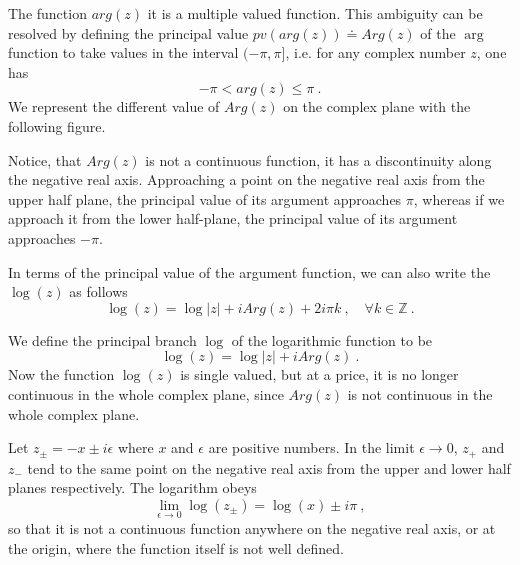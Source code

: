 \documentclass[10pt]{book}
\newcommand{\abs}[1]{\left|#1\right|}
\newcommand{\Zbb}{\mathbb{Z}}
\theoremstyle{break}
\begin{document}
The function $arg(z)$ it is a multiple valued function. This ambiguity can be resolved by defining the principal value $pv\left(arg(z)\right)\doteq Arg\left(z\right)$ of the $\arg$ function to take values in the interval $(-\pi,\pi]$, i.e. for any complex number $z$, one has
\begin{equation*}
 -\pi < arg(z) \leq \pi \ .
\end{equation*}
We represent the different value of $Arg(z)$ on the complex plane with the following figure. \par
Notice, that $Arg(z)$ is not a continuous function, it has a discontinuity along the negative real axis. Approaching a point on the negative real axis from the upper half plane, the principal value of its argument approaches $\pi$, whereas if we approach it from the lower half-plane, the principal value of its argument approaches $-\pi$. \par

In terms of the principal value of the argument function, we can also write the $\log(z)$ as follows
\begin{equation*}
 \log(z) = \log\abs{z} + iArg\left(z\right)  + 2i\pi k \ , \quad \forall k \in \Zbb \ .
\end{equation*}

We define the principal branch $\log$ of the logarithmic function to be
\begin{equation*}
 \log(z) = \log\abs{z} + i Arg(z) \ .
\end{equation*}
Now the function $\log(z)$ is single valued, but at a price, it is no longer continuous in the whole complex plane, since $Arg(z)$ is not continuous in the whole complex plane. \par

Let $z_{\pm} = -x \pm i \epsilon$ where $x$ and $\epsilon$ are positive numbers. In the limit $\epsilon \to 0$, $z_{+}$ and $z_{-}$ tend to the same point on the negative real axis from the upper and lower half planes respectively. The logarithm obeys
\begin{equation*}
 \lim_{\epsilon \to 0} \log(z_{\pm}) = \log(x) \pm i \pi \ ,
\end{equation*}
so that it is not a continuous function anywhere on the negative real axis, or at the origin, where the function itself is not well defined. 
\end{document}
